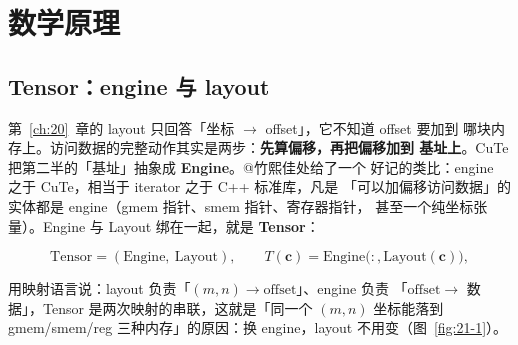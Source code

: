 \section{数学原理}

\subsection{Tensor：engine 与 layout}

第~\ref{ch:20}~章的 layout 只回答「坐标 $\to$ offset」，它不知道 offset 要加到
哪块内存上。访问数据的完整动作其实是两步：\textbf{先算偏移，再把偏移加到
基址上}。CuTe 把第二半的「基址」抽象成 \textbf{Engine}。@竹熙佳处给了一个
好记的类比：engine 之于 CuTe，相当于 iterator 之于 C++ 标准库，凡是
「可以加偏移访问数据」的实体都是 engine（gmem 指针、smem 指针、寄存器指针，
甚至一个纯坐标张量）。Engine 与 Layout 绑在一起，就是 \textbf{Tensor}：

\begin{equation}
  \mathrm{Tensor} = (\text{Engine},\ \text{Layout}), \qquad
  T(\mathbf{c}) = \mathrm{Engine}\bigl(:, \mathrm{Layout}(\mathbf{c})\bigr) ,
  \label{eq:21-tensor}
\end{equation}

用映射语言说：layout 负责「$(m,n)\to\mathrm{offset}$」、engine 负责
「$\mathrm{offset}\to$ 数据」，Tensor 是两次映射的串联，这就是「同一个
$(m,n)$ 坐标能落到 gmem/smem/reg 三种内存」的原因：换 engine，layout
不用变（图~\ref{fig:21-1}）。


